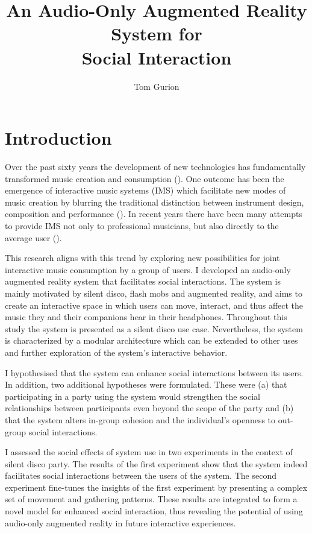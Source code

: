 \documentclass[a4paper,11pt]{article}
\title{An Audio-Only Augmented Reality System for\\Social Interaction}
\author{Tom Gurion}
\begin{document}
\maketitle

\tableofcontents

\section{Introduction}

Over the past sixty years the development of new technologies has fundamentally transformed music creation and consumption (\cite{hargreaves99}).
One outcome has been the emergence of interactive music systems (IMS) which facilitate new modes of music creation by blurring the traditional distinction between instrument design, composition and performance (\cite{drummond09}).
In recent years there have been many attempts to provide IMS not only to professional musicians, but also directly to the average user (\cite{stimulant13}).

This research aligns with this trend by exploring new possibilities for joint interactive music consumption by a group of users.
I developed an audio-only augmented reality system that facilitates social interactions.
The system is mainly motivated by silent disco, flash mobs and augmented reality, and aims to create an interactive space in which users can move, interact, and thus affect the music they and their companions hear in their headphones.
Throughout this study the system is presented as a silent disco use case.
Nevertheless, the system is characterized by a modular architecture which can be extended to other uses and further exploration of the system's interactive behavior.

I hypothesised that the system can enhance social interactions between its users.
In addition, two additional hypotheses were formulated.
These were (a) that participating in a party using the system would strengthen the social relationships between participants even beyond the scope of the party and (b) that the system alters in-group cohesion and the individual's openness to out-group social interactions.

I assessed the social effects of system use in two experiments in the context of silent disco party.
The results of the first experiment show that the system indeed facilitates social interactions between the users of the system.
The second experiment fine-tunes the insights of the first experiment by presenting a complex set of movement and gathering patterns.
These results are integrated to form a novel model for enhanced social interaction, thus revealing the potential of using audio-only augmented reality in future interactive experiences.
\end{document}
